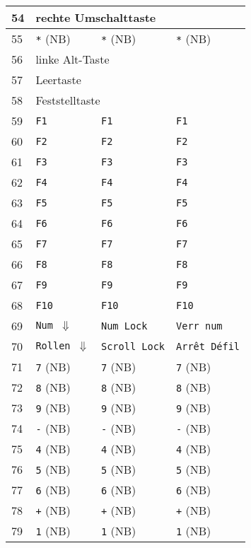 \begin{longtable}{|l|l|l|l|}
  54 & \multicolumn{3}{|l|}{rechte Umschalttaste} \\ \hline
  55 & \texttt{*} (NB) & \texttt{*} (NB) & \texttt{*} (NB) \\ \hline
  56 & \multicolumn{3}{|l|}{linke Alt-Taste} \\ \hline
  57 & \multicolumn{3}{|l|}{Leertaste} \\ \hline
  58 & \multicolumn{3}{|l|}{Feststelltaste} \\ \hline
  59 & \texttt{F1} & \texttt{F1} & \texttt{F1} \\ \hline
  60 & \texttt{F2} & \texttt{F2} & \texttt{F2} \\ \hline
  61 & \texttt{F3} & \texttt{F3} & \texttt{F3} \\ \hline
  62 & \texttt{F4} & \texttt{F4} & \texttt{F4} \\ \hline
  63 & \texttt{F5} & \texttt{F5} & \texttt{F5} \\ \hline
  64 & \texttt{F6} & \texttt{F6} & \texttt{F6} \\ \hline
  65 & \texttt{F7} & \texttt{F7} & \texttt{F7} \\ \hline
  66 & \texttt{F8} & \texttt{F8} & \texttt{F8} \\ \hline
  67 & \texttt{F9} & \texttt{F9} & \texttt{F9} \\ \hline
  68 & \texttt{F10} & \texttt{F10} & \texttt{F10} \\ \hline
  69 & \texttt{Num $\Downarrow$} & \texttt{Num Lock} & \texttt{Verr num} \\ \hline
  70 & \texttt{Rollen $\Downarrow$} & \texttt{Scroll Lock} & \texttt{Arrêt Défil} \\ \hline
  71 & \texttt{7} (NB) & \texttt{7} (NB) & \texttt{7} (NB) \\ \hline
  72 & \texttt{8} (NB) & \texttt{8} (NB) & \texttt{8} (NB) \\ \hline
  73 & \texttt{9} (NB) & \texttt{9} (NB) & \texttt{9} (NB) \\ \hline
  74 & \texttt{-} (NB) & \texttt{-} (NB) & \texttt{-} (NB) \\ \hline
  75 & \texttt{4} (NB) & \texttt{4} (NB) & \texttt{4} (NB) \\ \hline
  76 & \texttt{5} (NB) & \texttt{5} (NB) & \texttt{5} (NB) \\ \hline
  77 & \texttt{6} (NB) & \texttt{6} (NB) & \texttt{6} (NB) \\ \hline
  78 & \texttt{+} (NB) & \texttt{+} (NB) & \texttt{+} (NB) \\ \hline
  79 & \texttt{1} (NB) & \texttt{1} (NB) & \texttt{1} (NB) \\ \hline

\end{longtable}
